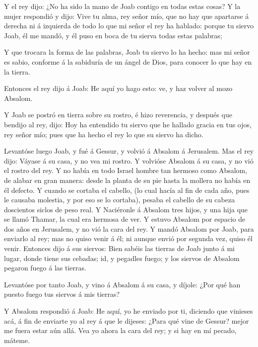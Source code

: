  Y el rey dijo: ¿No ha sido la mano de Joab contigo en
todas estas cosas? Y la mujer respondió y dijo: Vive tu alma, rey señor
mío, que no hay que apartarse á derecha ni á izquierda de todo lo que mi
señor el rey ha hablado: porque tu siervo Joab, él me mandó, y él puso
en boca de tu sierva todas estas palabras;

 Y que trocara la forma de las palabras, Joab tu siervo lo
ha hecho: mas mi señor es sabio, conforme á la sabiduría de un ángel de
Dios, para conocer lo que hay en la tierra.

 Entonces el rey dijo á Joab: He aquí yo hago esto: ve, y
haz volver al mozo Absalom.

 Y Joab se postró en tierra sobre su rostro, é hizo
reverencia, y después que bendijo al rey, dijo: Hoy ha entendido tu
siervo que he hallado gracia en tus ojos, rey señor mío; pues que ha
hecho el rey lo que su siervo ha dicho.

 Levantóse luego Joab, y fué á Gessur, y volvió á Absalom á
Jerusalem.  Mas el rey dijo: Váyase á su casa, y no vea mi
rostro. Y volvióse Absalom á su casa, y no vió el rostro del rey.
 Y no había en todo Israel hombre tan hermoso como Absalom,
de alabar en gran manera: desde la planta de su pie hasta la mollera no
había en él defecto.  Y cuando se cortaba el cabello, (lo
cual hacía al fin de cada año, pues le causaba molestia, y por eso se lo
cortaba), pesaba el cabello de su cabeza doscientos siclos de peso real.
 Y Naciéronle á Absalom tres hijos, y una hija que se llamó
Thamar, la cual era hermosa de ver.  Y estuvo Absalom por
espacio de dos años en Jerusalem, y no vió la cara del rey.
 Y mandó Absalom por Joab, para enviarlo al rey; mas no
quiso venir á él; ni aunque envió por segunda vez, quiso él venir.
 Entonces dijo á sus siervos: Bien sabéis las tierras de
Joab junto á mi lugar, donde tiene sus cebadas; id, y pegadles fuego; y
los siervos de Absalom pegaron fuego á las tierras.

 Levantóse por tanto Joab, y vino á Absalom á su casa, y
díjole: ¿Por qué han puesto fuego tus siervos á mis tierras?

 Y Absalom respondió á Joab: He aquí, yo he enviado por ti,
diciendo que vinieses acá, á fin de enviarte yo al rey á que le dijeses:
¿Para qué vine de Gessur? mejor me fuera estar aún allá. Vea yo ahora la
cara del rey; y si hay en mí pecado, máteme.

